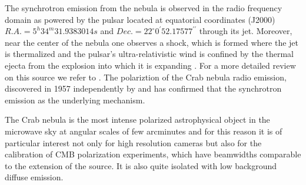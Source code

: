 \documentclass[twocolumn,traditabstract]{aa}
\begin{document}
The synchrotron emission from the nebula is observed in the radio frequency domain as
powered by the pulsar located at equatorial coordinates (J2000) $R.A. =
5^h34^m31.9383014s$ and $Dec. = 22^{\circ}0^{\prime}52.17577^{\prime\prime}$ \citep{Lobanov} through its jet.
Moreover, near the center of the nebula one observes a shock, which is formed
where the jet is thermalized and the pulsar's ultra-relativistic wind is confined by the thermal ejecta from the explosion into
which it is expanding \citep{2000ApJ...536L..81W,2011A&A...528A..11W}. For a more detailed review on this source
we refer to \citet{2008ARA&A..46..127H}.
The polariztion of the Crab nebula radio emission, discovered in 1957 independently by \citet{1957ApJ...126..468M} and \citet{1959SvA.....3...39K}
 has confirmed that the synchrotron emission as the underlying mechanism. 

The Crab nebula is the most intense polarized astrophysical object in the microwave sky
at angular scales of few arcminutes and for this reason it is of particular
interest not only for high resolution cameras but also for the calibration of CMB polarization experiments, which have
beamwidths comparable to the extension of the source. It is also quite isolated
with low background diffuse emission. 

\end{document}
